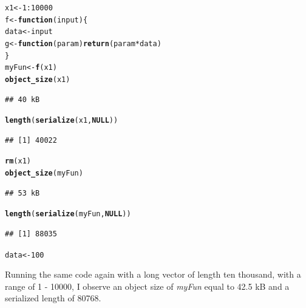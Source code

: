 \documentclass{article}\usepackage[]{graphicx}\usepackage[]{color}
\makeatletter
\newcommand{\hlnum}[1]{\textcolor[rgb]{0.686,0.059,0.569}{#1}}%
\newcommand{\hlopt}[1]{\textcolor[rgb]{0,0,0}{#1}}%
\newcommand{\hlstd}[1]{\textcolor[rgb]{0.345,0.345,0.345}{#1}}%
\newcommand{\hlkwa}[1]{\textcolor[rgb]{0.161,0.373,0.58}{\textbf{#1}}}%
\newcommand{\hlkwb}[1]{\textcolor[rgb]{0.69,0.353,0.396}{#1}}%
\newcommand{\hlkwc}[1]{\textcolor[rgb]{0.333,0.667,0.333}{#1}}%
\newcommand{\hlkwd}[1]{\textcolor[rgb]{0.737,0.353,0.396}{\textbf{#1}}}%
\newenvironment{kframe}{%
 \def\at@end@of@kframe{}%
 \ifinner\ifhmode%
  \def\at@end@of@kframe{\end{minipage}}%
  \begin{minipage}{\columnwidth}%
 \fi\fi%
 \def\FrameCommand##1{\hskip\@totalleftmargin \hskip-\fboxsep
 \colorbox{shadecolor}{##1}\hskip-\fboxsep
     \hskip-\linewidth \hskip-\@totalleftmargin \hskip\columnwidth}%
 \MakeFramed {\advance\hsize-\width
   \@totalleftmargin\z@ \linewidth\hsize
   \@setminipage}}%
 {\par\unskip\endMakeFramed%
 \at@end@of@kframe}
\newenvironment{knitrout}{}{} %
\makeatother
\begin{document}
\begin{knitrout}
\color{fgcolor}\begin{kframe}
\begin{alltt}
\hlstd{x1} \hlkwb{<-} \hlnum{1}\hlopt{:}\hlnum{10000}
\hlstd{f} \hlkwb{<-} \hlkwa{function}\hlstd{(}\hlkwc{input}\hlstd{) \{}
  \hlstd{data} \hlkwb{<-} \hlstd{input}
  \hlstd{g} \hlkwb{<-} \hlkwa{function}\hlstd{(}\hlkwc{param}\hlstd{)} \hlkwd{return}\hlstd{(param} \hlopt{*} \hlstd{data)}
\hlstd{\}}
\hlstd{myFun} \hlkwb{<-} \hlkwd{f}\hlstd{(x1)}
\hlkwd{object_size}\hlstd{(x1)}
\end{alltt}
\begin{verbatim}
## 40 kB
\end{verbatim}
\begin{alltt}
\hlkwd{length}\hlstd{(}\hlkwd{serialize}\hlstd{(x1,} \hlkwa{NULL}\hlstd{))}
\end{alltt}
\begin{verbatim}
## [1] 40022
\end{verbatim}
\begin{alltt}
\hlkwd{rm}\hlstd{(x1)}
\hlkwd{object_size}\hlstd{(myFun)}
\end{alltt}
\begin{verbatim}
## 53 kB
\end{verbatim}
\begin{alltt}
\hlkwd{length}\hlstd{(}\hlkwd{serialize}\hlstd{(myFun,} \hlkwa{NULL}\hlstd{))}
\end{alltt}
\begin{verbatim}
## [1] 88035
\end{verbatim}
\begin{alltt}
\hlstd{data} \hlkwb{<-} \hlnum{100}
\end{alltt}
\end{kframe}
\end{knitrout}
Running the same code again with a long vector of length ten thousand, with a range of 1 - 10000, I observe an object size of \emph{myFun} equal to 42.5 kB and a serialized length of 80768.
\end{document}

